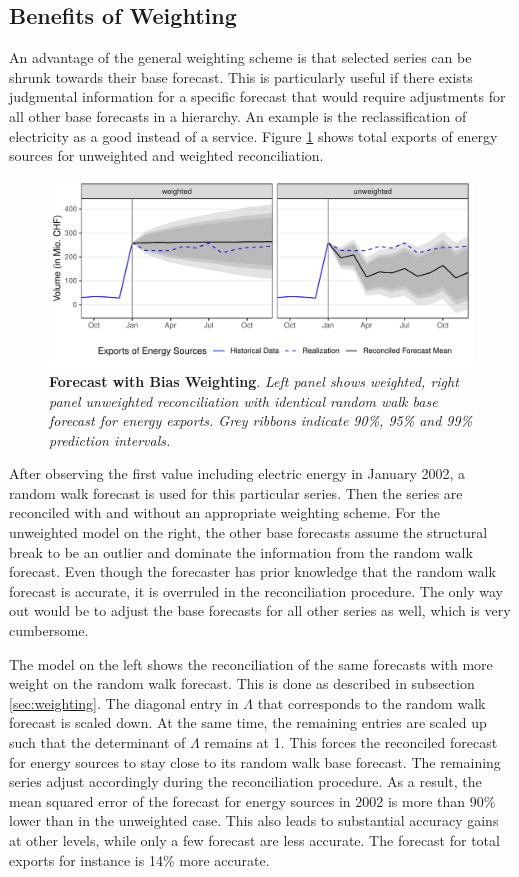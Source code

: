 \documentclass[a4paper,fleqn,11pt]{article}
\begin{document}
\subsection{Benefits of Weighting}\label{sec:resweight}
An advantage of the general weighting scheme is that selected series can be shrunk towards their base forecast. This is particularly useful if there exists judgmental information for a specific forecast that would require adjustments for all other base forecasts in a hierarchy. An example is the reclassification of electricity as a good instead of a service. Figure \ref{fig:fcex} shows total exports of energy sources for unweighted and weighted reconciliation.
\begin{figure}[H]
	\includegraphics[width=\textwidth]{fig/fig_electricity}
	\caption[Forecast with Bias Weighting]{\small{\textbf{Forecast with Bias Weighting}. \textit{Left panel shows weighted, right panel unweighted reconciliation with identical random walk base forecast for energy exports. Grey ribbons indicate 90\%, 95\% and 99\% prediction intervals.}}}\label{fig:fcex}
\end{figure}
After observing the first value including electric energy in January 2002, a random walk forecast is used for this particular series. Then the series are reconciled with and without an appropriate weighting scheme. For the unweighted model on the right, the other base forecasts assume the structural break to be an outlier and dominate the information from the random walk forecast. Even though the forecaster has prior knowledge that the random walk forecast is accurate, it is overruled in the reconciliation procedure. The only way out would be to adjust the base forecasts for all other series as well, which is very cumbersome.

The model on the left shows the reconciliation of the same forecasts with more weight on the random walk forecast. This is done as described in subsection \ref{sec:weighting}. The diagonal entry in $\Lambda$ that corresponds to the random walk forecast is scaled down. At the same time, the remaining entries are scaled up such that the determinant of $\Lambda$ remains at 1. This forces the reconciled forecast for energy sources to stay close to its random walk base forecast. The remaining series adjust accordingly during the reconciliation procedure. As a result, the mean squared error of the forecast for energy sources in 2002 is more than 90\% lower than in the unweighted case. This also leads to substantial accuracy gains at other levels, while only a few forecast are less accurate. The forecast for total exports for instance is 14\% more accurate.
\end{document}
